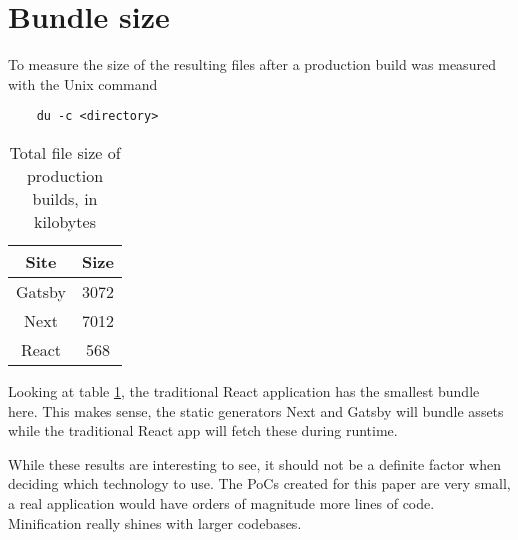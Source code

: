 \section{Bundle size}

To measure the size of the resulting files after a production build was measured with the Unix command 

\begin{verbatim}
	du -c <directory>
\end{verbatim}

\begin{table}[htb!]
	\begin{center}
		\begin{tabular}{||c c||} 
			\hline
			Site   & Size \\ [0.5ex] 
			\hline\hline
			Gatsby & 3072 \\ 
			\hline
			Next   & 7012 \\
			\hline
			React  & 568  \\[1ex] 
			\hline
		\end{tabular}
		\caption{Total file size of production builds, in kilobytes }
		\label{tbl:bundle_size}
	\end{center}
\end{table}

Looking at table \ref{tbl:bundle_size}, the traditional React application has the smallest bundle here. 
This makes sense, the static generators Next and Gatsby will bundle assets while the traditional React app will fetch these during runtime.

While these results are interesting to see, it should not be a definite factor when deciding which technology to use.
The PoCs created for this paper are very small, a real application would have orders of magnitude more lines of code.
Minification really shines with larger codebases. 